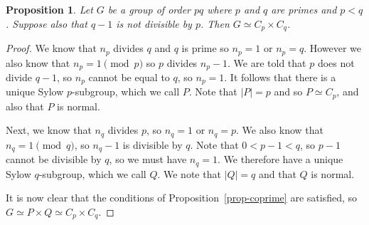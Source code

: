 \documentclass{amsart}
\newcommand{\tm}        {\times}
\renewcommand{\:}{\colon}
\newtheorem{proposition}[theorem]{Proposition}
\theoremstyle{definition}
\begin{document}
\begin{proposition}\label{prop-pq}
 Let $G$ be a group of order $pq$ where $p$ and $q$ are primes and
 $p<q$.  Suppose also that $q-1$ is not divisible by $p$.  Then
 $G\simeq C_p\tm C_q$.
\end{proposition}
\begin{proof}
 We know that $n_p$ divides $q$ and $q$ is prime so $n_p=1$ or
 $n_p=q$.  However we also know that $n_p=1\pmod{p}$ so $p$ divides
 $n_p-1$.  We are told that $p$ does not divide $q-1$, so $n_p$ cannot
 be equal to $q$, so $n_p=1$.  It follows that there is a unique Sylow
 $p$-subgroup, which we call $P$.  Note that $|P|=p$ and so
 $P\simeq C_p$, and also that $P$ is normal.

 Next, we know that $n_q$ divides $p$, so $n_q=1$ or $n_q=p$.  We also
 know that $n_q=1\pmod{q}$, so $n_q-1$ is divisible by $q$.  Note that
 $0<p-1<q$, so $p-1$ cannot be divisible by $q$, so we must have
 $n_q=1$.  We therefore have a unique Sylow $q$-subgroup, which we
 call $Q$.  We note that $|Q|=q$ and that $Q$ is normal.

 It is now clear that the conditions of Proposition~\ref{prop-coprime}
 are satisfied, so $G\simeq P\tm Q\simeq C_p\tm C_q$.
\end{proof}
\end{document}

